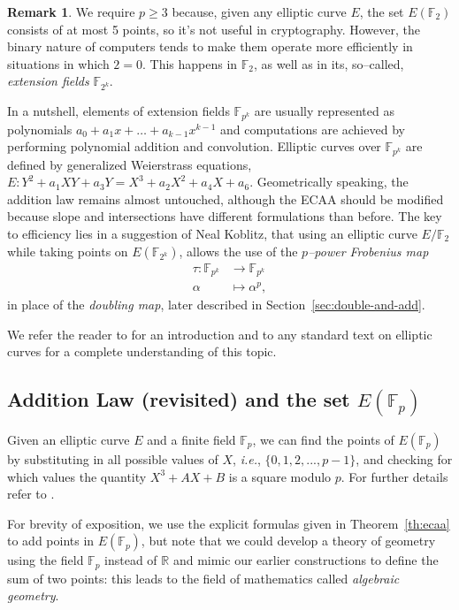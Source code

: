 \documentclass[9pt]{article}
\theoremstyle{definition}
\newtheorem*{remark}{Remark}
\begin{document}
\begin{remark}
    We require $p \geq 3$ because, given any elliptic curve $E$, the set $E(\mathbb{F}_2)$ consists of at most 5 points, so it's not useful in cryptography. However, the binary nature of computers tends to make them operate more efficiently in situations in which $2 = 0$. This happens in $\mathbb{F}_2$, as well as in its, so--called, \textit{extension fields} $\mathbb{F}_{2^k}$.
    
    In a nutshell, elements of extension fields $\mathbb{F}_{p^k}$ are usually represented as polynomials $a_0 + a_1 x + \dots + a_{k-1} x^{k-1}$ and computations are achieved by performing polynomial addition and convolution. Elliptic curves over $\mathbb{F}_{p^k}$ are defined by generalized Weierstrass equations, $E: Y^2 + a_1 XY + a_3 Y = X^3 + a_2 X^2 + a_4 X + a_6$. Geometrically speaking, the addition law remains almost untouched, although the ECAA should be modified because slope and intersections have different formulations than before. The key to efficiency lies in a suggestion of Neal Koblitz, that using an elliptic curve $E/\mathbb{F}_2$ while taking points on $E(\mathbb{F}_{2^k})$, allows the use of the \textit{$p$--power Frobenius map}
    \begin{align*}
        \tau : \mathbb{F}_{p^k} &\longrightarrow \mathbb{F}_{p^k}\\
               \alpha &\longmapsto \alpha^p,
    \end{align*}
    in place of the \textit{doubling map}, later described in Section~\ref{sec:double-and-add}.
    
    We refer the reader to \cite[Section~5.7]{JH08} for an introduction and to any standard text on elliptic curves for a complete understanding of this topic.
\end{remark}

\subsection{Addition Law (revisited) and the set $E(\mathbb{F}_p)$}
Given an elliptic curve $E$ and a finite field $\mathbb{F}_p$, we can find the points of $E(\mathbb{F}_p)$ by substituting in all possible values of $X$, \textit{i.e.}, $\{0,1,2,...,p-1\}$, and checking for which values the quantity $X^3 + AX + B$ is a square modulo $p$. For further details refer to \cite[Example~5.8]{JH08}.

For brevity of exposition, we use the explicit formulas given in Theorem~\ref{th:ecaa} to add points in $E(\mathbb{F}_p)$, but note that we could develop a theory of geometry using the field $\mathbb{F}_p$ instead of $\mathbb{R}$ and mimic our earlier constructions to define the sum of two points: this leads to the field of mathematics called \textit{algebraic geometry}.
\end{document}
